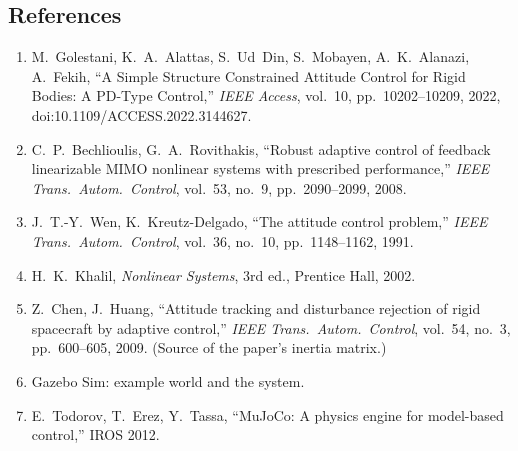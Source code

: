 \subsection{References}
\begin{enumerate}[leftmargin=*]
  \item M.~Golestani, K.~A.~Alattas, S.~Ud~Din, S.~Mobayen, A.~K.~Alanazi, A.~Fekih, ``A Simple Structure Constrained Attitude
        Control for Rigid Bodies: A PD-Type Control,'' \emph{IEEE Access}, vol.~10, pp.~10202--10209, 2022,
        doi:10.1109/ACCESS.2022.3144627.
  \item C.~P.~Bechlioulis, G.~A.~Rovithakis, ``Robust adaptive control of feedback linearizable MIMO nonlinear systems with
        prescribed performance,'' \emph{IEEE Trans.\ Autom.\ Control}, vol.~53, no.~9, pp.~2090--2099, 2008.
  \item J.~T.-Y.~Wen, K.~Kreutz-Delgado, ``The attitude control problem,'' \emph{IEEE Trans.\ Autom.\ Control}, vol.~36, no.~10,
        pp.~1148--1162, 1991.
  \item H.~K.~Khalil, \emph{Nonlinear Systems}, 3rd ed., Prentice Hall, 2002.
  \item Z.~Chen, J.~Huang, ``Attitude tracking and disturbance rejection of rigid spacecraft by adaptive control,''
        \emph{IEEE Trans.\ Autom.\ Control}, vol.~54, no.~3, pp.~600--605, 2009. (Source of the paper's inertia matrix.)
  \item Gazebo Sim:  example world and the  system.
  \item E.~Todorov, T.~Erez, Y.~Tassa, ``MuJoCo: A physics engine for model-based control,'' IROS 2012.
\end{enumerate}
